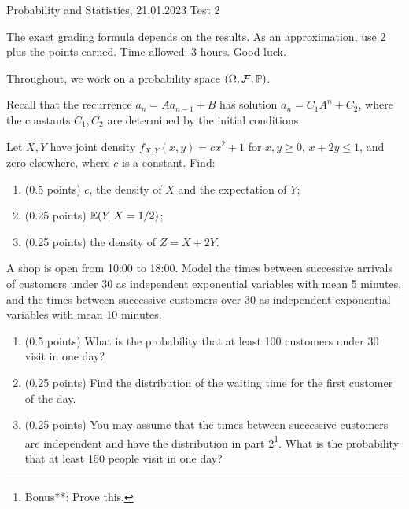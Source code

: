 \documentclass[a4paper]{report}
\begin{document}
\noindent Probability and Statistics, 21.01.2023 \hfill Test 2

\hrulefill

\begin{it}
The exact grading formula depends on the results. As an approximation, use 2 plus the points earned. Time allowed: 3 hours. Good luck.

Throughout, we work on a probability space $(\Omega, {\mathcal{F}}, \mathbb P)$.

Recall that
the recurrence
$a_n = A a_{n-1} + B$
has solution
$a_n = C_1 A^n + C_2$,
where the constants
$C_1,C_2$ are determined
by the initial conditions.

\end{it}

\begin{problem}
Let $X,Y$ have joint density $f_{X,Y}(x,y)=cx^2+1$ for $x,y\geq0$, $x+2y\leq1$, and zero elsewhere, where $c$ is
a constant. Find:

\begin{enumerate}

    \item (0.5 points) $c$, the density of $X$ and the expectation of $Y$;
\item (0.25 points) $\mathbb {E}(Y|X=1/2)$;
\item (0.25 points) the density of $Z=X+2Y$.

\end{enumerate}

\end{problem}

\begin{problem} A shop is open from 10:00 to 18:00. Model the times between successive arrivals of customers under 30 as independent exponential
variables with mean 5 minutes, and the times between successive customers over 30 as independent exponential variables with mean 10 minutes.

\begin{enumerate}
    \item (0.5 points) What is the probability that at least 100 customers under 30 visit in one day?
    \item (0.25 points) Find the distribution of the waiting time for the first customer of the day.
    \item (0.25 points)
    You may assume that the times between successive customers are independent and have the distribution in part 2\footnote{Bonus**: Prove this.}. What is the probability that at least 150 people visit in one day?
\end{enumerate}

\end{problem}
\end{document}
